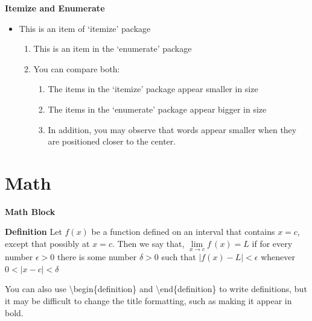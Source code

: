 \documentclass[12pt, aspectratio=169]{beamer}
\begin{document}
\linespread{1} 
\begin{frame}[<+>]{\textbf{Itemize and Enumerate}}
\linespread{1.5} 

	\begin{itemize}[] %
		\item This is an item of `itemize' package
		\begin{enumerate}[] %
			\item This is an item in the `enumerate' package
			\item You can compare both:
				\begin{enumerate}[1] %
					\item The items in the `itemize' package appear smaller in size
					\item The items in the `enumerate' package appear bigger in size
					\item In addition, you may observe that words appear smaller when they are positioned closer to the center.
				\end{enumerate}
		\end{enumerate}
	\end{itemize}
	
\end{frame}


\section{Math}


\linespread{1}
\begin{frame}{\textbf{Math Block}}
\linespread{1.5} 

	\begin{block}{\textbf{Definition}} 
		Let $f\left(x\right)$ be a function defined on an interval that contains $x=c$,
		except that possibly at $x=c$. Then we say that,
		$\lim\limits_{x\rightarrow c} f\,(x)=L$
		if for every number $\epsilon > 0$ there is some number  $\delta > 0$ such that
		$\left\vert f(x)-L \right\vert < \epsilon$ whenever $0<\left\vert x-c \right\vert < \delta$
	\end{block}
	
	\begin{definition}
		You can also use \textbackslash{}begin\{definition\} and \textbackslash{}end\{definition\} to write definitions,
		but it may be difficult to change the title formatting,
		such as making it appear in bold.
	\end{definition}
	
\end{frame}
\end{document}
